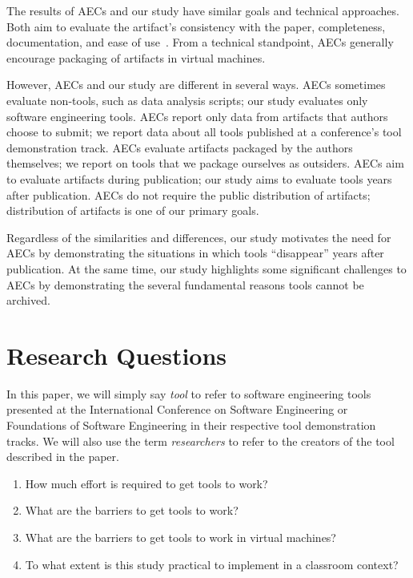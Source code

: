 \documentclass[10pt,conference]{IEEEtran}
\begin{document}
The results of AECs and our study have 
similar goals and technical approaches.
Both aim to evaluate the artifact's 
consistency with the paper,
completeness,
documentation,
and ease of use~\cite{evaluate}.
From a technical standpoint, AECs generally  
encourage packaging of artifacts in virtual machines.

However, AECs and our study are different in several
ways.
AECs sometimes evaluate non-tools, such as data analysis scripts; 
our study evaluates only software engineering tools.
AECs report only data from artifacts that authors choose to submit;
we report data about all tools published at a 
conference's tool demonstration track.
AECs evaluate artifacts packaged by the authors themselves;
we report on tools that we package ourselves as outsiders.
AECs aim to evaluate artifacts during publication;
our study aims to evaluate tools years after publication.
AECs do not require the public distribution of artifacts;
distribution of artifacts is one of our primary goals.

Regardless of the similarities and differences,
our study motivates the need for AECs by demonstrating
the situations in which tools ``disappear'' years
after publication.
At the same time, our study highlights some significant
challenges to AECs by demonstrating the several
fundamental reasons tools cannot be archived. 


\section{Research Questions}

In this paper, we will simply say \emph{tool}
to refer to software engineering tools presented at
the International Conference on Software Engineering
or Foundations of Software Engineering in their
respective tool demonstration tracks.
We will also use the term \emph{researchers} to refer to 
the creators of the tool described in the paper. 

\begin{enumerate}
  \item How much effort is required to get tools to work?
  \item What are the barriers to get tools to work?
  \item What are the barriers to get tools to work in virtual machines?
  \item To what extent is this study practical to implement in a classroom context?
\end{enumerate}
\end{document}
